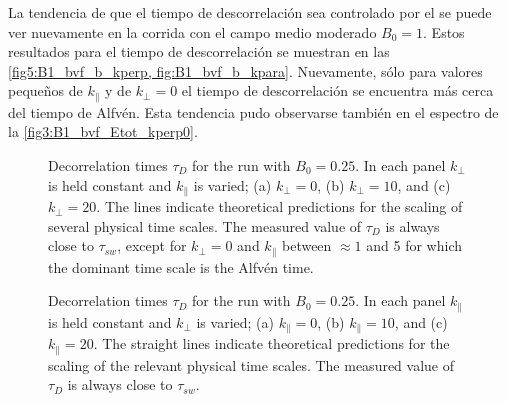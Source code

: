La tendencia de que el tiempo de descorrelación sea controlado por el
\sweeping se puede ver nuevamente en la corrida con el campo medio
moderado $B_0=1$.  Estos resultados para el tiempo de descorrelación
se muestran en las \cref{fig5:B1_bvf_b_kperp,
  fig:B1_bvf_b_kpara}. Nuevamente, sólo para valores pequeños de
$k_{\parallel}$ y de $k_{\perp}=0$ el tiempo de descorrelación se
encuentra más cerca del tiempo de Alfvén. Esta tendencia pudo
observarse también en el espectro de la
\cref{fig3:B1_bvf_Etot_kperp0}.

\begin{figure}
  \centering


  \caption{Decorrelation times $\tau_D$ for the run with 
    $B_0=0.25$. In each panel $k_\perp$ is held constant and $k_\parallel$
    is varied; (a) $k_\perp = 0$, (b) $k_\perp = 10$, and (c) $k_\perp =
    20$. The lines indicate theoretical predictions for the scaling of
    several physical time scales. The measured value of $\tau_D$ is always
    close to $\tau_{sw}$, except for $k_\perp = 0$ and $k_\parallel$
    between $\approx 1$ and 5 for which the dominant time scale is the
    Alfv\'en time.}
  \label{fig5:B025_bvf_b_kperp}
\end{figure}

\begin{figure}
  \centering


  \caption{Decorrelation times $\tau_D$ for the run with
    $B_0=0.25$. In each panel $k_\parallel$ is held constant and
    $k_\perp$ is varied; (a) $k_\parallel = 0$, (b) $k_\parallel =
    10$, and (c) $k_\parallel = 20$. The straight lines indicate 
    theoretical predictions for the scaling of the relevant physical time
    scales. The measured value of $\tau_D$ is always close to
    $\tau_{sw}$.}
  \label{fig5:B025_bvf_b_kpara}
\end{figure}

